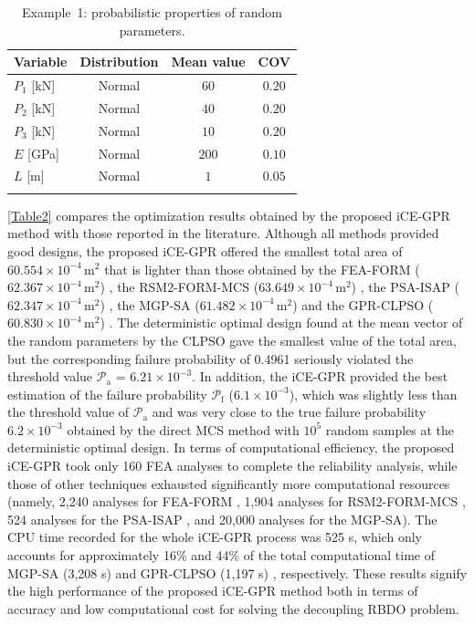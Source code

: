 \documentclass[preprint,3p]{elsarticle}
\begin{document}
\begin{linenumbers}
\begin{table}[h]
    \caption{Example~1: probabilistic properties of random parameters.}
    \label{Table1}
    \begin{center}
        \begin{tabular}{lccc}
            \hline \noalign{\smallskip}
            Variable & Distribution & Mean value & COV\\
            \hline \noalign{\smallskip}
            $P_1$ [kN] &    Normal  & $60$ & $0.20$\\
            $P_2$ [kN] &    Normal &    $40$ &  $0.20$\\
            $P_3$ [kN] &    Normal &    $10$ &  $0.20$\\
            $E$  [GPa] & Normal &   $200$ & $0.10$\\
            $L$   [m] & Normal &    $1$ &   $0.05$\\
            \hline \noalign{\smallskip}
        \end{tabular}
    \end{center}
\end{table}

\cref{Table2} compares the optimization results obtained by the proposed iCE-GPR method with those reported in the literature. Although all methods provided good designs, the proposed iCE-GPR offered the smallest total area of $60.554\times10^{-4}\,\text{m}^2$ that is lighter than those obtained by the FEA-FORM ($62.367\times10^{-4}\,\text{m}^2$) \cite{Zhao2013}, the RSM2-FORM-MCS ($63.649\times10^{-4}\,\text{m}^2$) \cite{Zhao2013}, the PSA-ISAP ($62.347\times10^{-4}\,\text{m}^2$) \cite{Ghasemi2019}, the MGP-SA ($61.482\times10^{-4}\,\text{m}^2$) \cite{Do2021a} and the GPR-CLPSO ($60.830\times10^{-4}\,\text{m}^2$) \cite{VANHUYNH2023}. The deterministic optimal design found at the mean vector of the random parameters by the CLPSO gave the smallest value of the total area, but the corresponding failure probability of 0.4961 seriously violated the threshold value $\mathcal{P}_\text{a}$ = $6.21\times10^{-3}$. In addition, the iCE-GPR provided the best estimation of the failure probability $\mathcal{P}_\text{f}$ ($6.1\times10^{-3}$), which was slightly less than the threshold value of $\mathcal{P}_\text{a}$ and was very close to the true failure probability $6.2\times10^{-3}$ obtained by the direct MCS method with $10^5$ random samples at the deterministic optimal design. In terms of computational efficiency, the proposed iCE-GPR took only 160 FEA analyses to complete the reliability analysis, while those of other techniques exhausted significantly more computational resources (namely, 2,240 analyses for FEA-FORM \cite{Zhao2013}, 1,904 analyses for RSM2-FORM-MCS \cite{Zhao2013}, 524 analyses for the PSA-ISAP \cite{Ghasemi2019}, and 20,000 analyses for the MGP-SA\cite{Do2021a}). The CPU time recorded for the whole iCE-GPR process was 525 s, which only accounts for approximately 16\% and 44\% of the total computational time of MGP-SA (3,208 s) \cite{Do2021a} and GPR-CLPSO (1,197 s) \cite{VANHUYNH2023}, respectively. These results signify the high performance of the proposed iCE-GPR method both in terms of accuracy and low computational cost for solving the decoupling RBDO problem.


\end{linenumbers}
\end{document}
